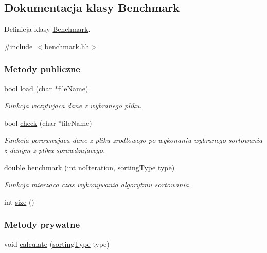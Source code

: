 \hypertarget{class_benchmark}{\subsection{Dokumentacja klasy Benchmark}
\label{class_benchmark}
}


Definicja klasy \hyperlink{class_benchmark}{Benchmark}.  




{\ttfamily \#include $<$benchmark.\-hh$>$}

\subsubsection*{Metody publiczne}
\begin{DoxyCompactItemize}
\item 
bool \hyperlink{class_benchmark_a2e75bf799e62f0144eaff00c9e3acb93}{load} (char $\ast$file\-Name)
\begin{DoxyCompactList}\small\item\em Funkcja wczytujaca dane z wybranego pliku. \end{DoxyCompactList}\item 
bool \hyperlink{class_benchmark_a12519069f87d9373e9382b65874ddb02}{check} (char $\ast$file\-Name)
\begin{DoxyCompactList}\small\item\em Funkcja porownujaca dane z pliku zrodlowego po wykonaniu wybranego sortowania z danym z pliku sprawdzajacego. \end{DoxyCompactList}\item 
double \hyperlink{class_benchmark_acff260f9f14f96d1e86f48ac724b625e}{benchmark} (int no\-Iteration, \hyperlink{benchmark_8hh_a08f516d96c62462f77e4e83d222bfdfb}{sorting\-Type} type)
\begin{DoxyCompactList}\small\item\em Funkcja mierzaca czas wykonywania algorytmu sortowania. \end{DoxyCompactList}\item 
int \hyperlink{class_benchmark_aa1ce894b0cf622b8f38c4618fd6e2dcb}{size} ()
\end{DoxyCompactItemize}
\subsubsection*{Metody prywatne}
\begin{DoxyCompactItemize}
\item 
void \hyperlink{class_benchmark_a6746cd9125d70b90e14bba55a6ed2a9a}{calculate} (\hyperlink{benchmark_8hh_a08f516d96c62462f77e4e83d222bfdfb}{sorting\-Type} type)
\end{DoxyCompactItemize}
